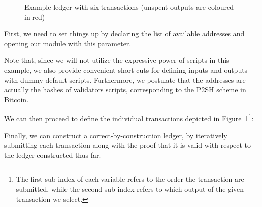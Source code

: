 \documentclass[acmsmall,nonacm=true,screen=true]{acmart}
\begin{document}
\begin{figure}
\caption{Example ledger with six transactions (unspent outputs are coloured in red)}
\label{fig:utxo-ledger}
\end{figure}

First, we need to set things up by declaring the list of available addresses and opening our module with this parameter.

\UTXOexampleSetup{}

\noindent
Note that, since we will not utilize the expressive power of scripts in this example, we also provide convenient short cuts for
defining inputs and outputs with dummy default scripts.
Furthermore, we postulate that the addresses are actually the hashes of validators scripts, corresponding to the P2SH scheme
in Bitcoin.

We can then proceed to define the individual transactions depicted in Figure~\ref{fig:utxo-ledger}\footnote{
The first sub-index of each variable refers to the order the transaction are submitted,
while the second sub-index refers to which output of the given transaction we select.}:

\UTXOexampleA{}

Finally, we can construct a correct-by-construction ledger, by iteratively submitting each transaction along with
the proof that it is valid with respect to the ledger constructed thus far.
\end{document}
